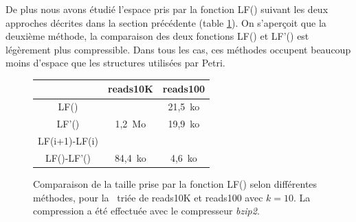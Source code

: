 De plus nous avons étudié l'espace pris par la fonction LF() suivant les deux approches décrites dans la section précédente (table \ref{resLF}). On s’aperçoit que la deuxième méthode, la comparaison des deux fonctions LF() et LF'() est légèrement plus compressible. Dans tous les cas, ces méthodes occupent beaucoup moins d'espace que les structures utilisées par Petri.

\begin{figure}
\begin{center}
\begin{tabular}{|c||c|c|}
	\hline
	 & reads10K & reads100\\ \hline \hline
	LF() & & 21,5~ko\\ \hline
	LF'() & 1,2~Mo & 19,9~ko\\ \hline
	LF(i+1)-LF(i) & & \\ \hline
	LF()-LF'() & 84,4~ko & 4,6~ko \\\hline
	
\end{tabular}
\caption{Comparaison de la taille prise par la fonction LF() selon différentes méthodes, pour la \kbwt\ triée de reads10K et reads100 avec $k=10$. La compression a été effectuée avec le compresseur \textit{bzip2}.}
\label{resLF}
\end{center}
\end{figure}

